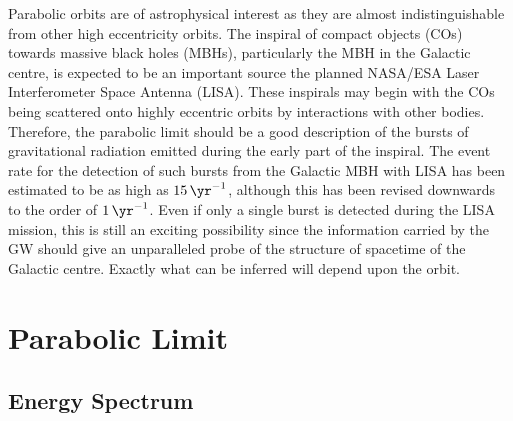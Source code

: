 \documentclass[aps,prd,amsfonts,amssymb,amsmath,reprint,showpacs,groupedaddress]{revtex4-1}
\begin{document}
Parabolic orbits are of astrophysical interest as they are almost indistinguishable from other high eccentricity orbits. The inspiral of compact objects (COs) towards massive black holes (MBHs), particularly the MBH in the Galactic centre, is expected to be an important source the planned NASA/ESA Laser Interferometer Space Antenna (LISA)\cite{Bender1998,Danzmann2003}. These inspirals may begin with the COs being scattered onto highly eccentric orbits by interactions with other bodies. Therefore, the parabolic limit should be a good description of the bursts of gravitational radiation emitted during the early part of the inspiral. The event rate for the detection of such bursts from the Galactic MBH with LISA has been estimated to be as high as $\SI{15}{\yr^{-1}}$\cite{Rubbo2006}, although this has been revised downwards to the order of $\SI{1}{\yr^{-1}}$\cite{Hopman2007}. Even if only a single burst is detected during the LISA mission, this is still an exciting possibility since the information carried by the GW should give an unparalleled probe of the structure of spacetime of the Galactic centre. Exactly what can be inferred will depend upon the orbit.

\section{Parabolic Limit\label{sec:limit}}

\subsection{Energy Spectrum}
\end{document}
